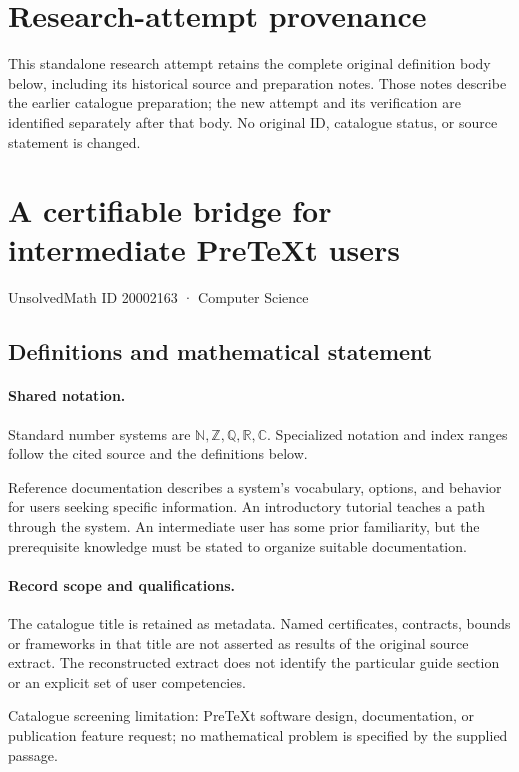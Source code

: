 \documentclass[11pt]{article}
\begin{document}
\section*{Research-attempt provenance}
This standalone research attempt retains the complete original definition body below,
including its historical source and preparation notes. Those notes describe the
earlier catalogue preparation; the new attempt and its verification are identified
separately after that body. No original ID, catalogue status, or source statement is changed.

\section{A certifiable bridge for intermediate PreTeXt users}\label{20002163}
{\small UnsolvedMath ID 20002163 · Computer Science}
\subsection{Definitions and mathematical statement}

\paragraph{Shared notation.}Standard number systems are $\mathbb N,\mathbb Z,\mathbb Q,\mathbb R,\mathbb C$. Specialized notation and index ranges follow the cited source and the definitions below.


Reference documentation describes a system's vocabulary, options, and behavior for users seeking specific information. An introductory tutorial teaches a path through the system. An intermediate user has some prior familiarity, but the prerequisite knowledge must be stated to organize suitable documentation.
\paragraph{Record scope and qualifications.}
The catalogue title is retained as metadata. Named certificates, contracts, bounds or frameworks in that title are not asserted as results of the original source extract.
The reconstructed extract does not identify the particular guide section or an explicit set of user competencies.

Catalogue screening limitation: PreTeXt software design, documentation, or publication feature request; no mathematical problem is specified by the supplied passage.
\end{document}
